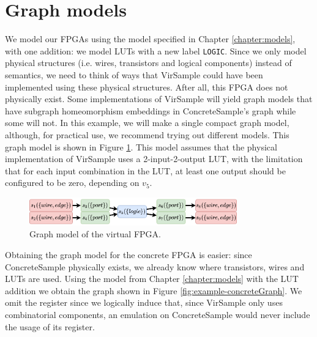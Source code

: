 \section{Graph models}
\label{sec:example-graphmodels}
We model our FPGAs using the model specified in Chapter \ref{chapter:models}, with one addition: we model LUTs with a new label \texttt{LOGIC}. Since we only model physical structures (i.e. wires, transistors and logical components) instead of semantics, we need to think of ways that VirSample could have been implemented using these physical structures. After all, this FPGA does not physically exist. Some implementations of VirSample will yield graph models that have subgraph homeomorphism embeddings in ConcreteSample's graph while some will not. In this example, we will make a single compact graph model, although, for practical use, we recommend trying out different models. This graph model is shown in Figure \ref{fig:example-virtualGraph}. This model assumes that the physical implementation of VirSample uses a 2-input-2-output LUT, with the limitation that for each input combination in the LUT, at least one output should be configured to be zero, depending on $v_5$.

\begin{figure}[t]
\centering
\includegraphics[width=0.8\textwidth]{images/endToEnd/virtualFPGAGraph.png}
\caption{Graph model of the virtual FPGA.}
\label{fig:example-virtualGraph}
\end{figure}

Obtaining the graph model for the concrete FPGA is easier: since ConcreteSample physically exists, we already know where transistors, wires and LUTs are used. Using the model from Chapter \ref{chapter:models} with the LUT addition we obtain the graph shown in Figure \ref{fig:example-concreteGraph}. We omit the register since we logically induce that, since VirSample only uses combinatorial components, an emulation on ConcreteSample would never include the usage of its register.

